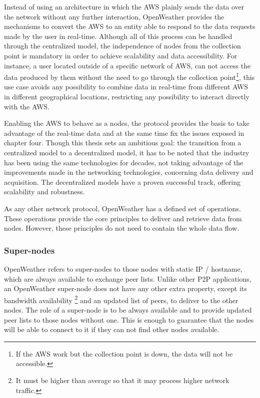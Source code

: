 Instead of using an architecture in which the \gls{AWS} plainly sends the data over the network without any further interaction, OpenWeather provides the mechanisms to convert the \gls{AWS} to an entity able to respond to the data requests made by the user in real-time. Although all of this process can be handled through the centralized model, the independence of nodes from the collection point  is mandatory in order to achieve scalability and data accessibility. For instance, a user located outside of a specific network of \gls{AWS}, can not access the data produced by them without the need to go through the collection point\footnote{If the \gls{AWS} work but the collection point is down, the data will not be accessible.}, this use case avoids any possibility to combine data in real-time from different \gls{AWS} in different geographical locations, restricting any possibility to interact directly with the \gls{AWS}.

Enabling the \gls{AWS} to behave as a nodes, the protocol provides the basis to take advantage of the real-time data and at the same time fix the issues exposed in chapter four. Though this thesis sets an ambitious goal: the transition from a centralized model to a decentralized model, it has to be noted that the industry has been using the same technologies for decades, not taking advantage of the improvements made in the networking technologies, concerning data delivery and acquisition. The decentralized models have a proven successful track, offering scalability and robustness.

As any other network protocol, OpenWeather has a defined set of operations. These operations provide the core principles to deliver and retrieve data from nodes. However, these principles do not need to contain the whole data flow.


\subsubsection{Super-nodes}
 
OpenWeather refers to super-nodes to those nodes with static \gls{IP} / hostname, which are always available to exchange peer lists. Unlike other \gls{P2P} applications, an OpenWeather super-node does not have any other extra property, except its bandwidth availability \footnote{It must be higher than average so that it may process higher network traffic.} and an updated list of peers, to deliver to the other nodes. The role of a super-node is to be always available and to provide updated peer lists to those nodes without one. This is enough to guarantee that the nodes will be able to connect to it if they can not find other nodes available.

